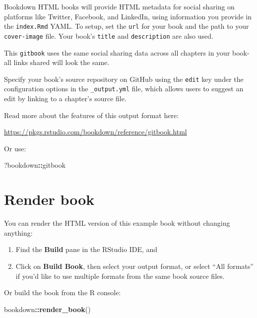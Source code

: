 \documentclass[
]{book}
\newenvironment{Shaded}{\begin{snugshade}}{\end{snugshade}}
\newcommand{\FunctionTok}[1]{\textcolor[rgb]{0.13,0.29,0.53}{\textbf{#1}}}
\newcommand{\NormalTok}[1]{#1}
\newcommand{\SpecialCharTok}[1]{\textcolor[rgb]{0.81,0.36,0.00}{\textbf{#1}}}
\theoremstyle{definition}
\theoremstyle{definition}
\theoremstyle{definition}
\theoremstyle{definition}
\theoremstyle{remark}
\begin{document}
Bookdown HTML books will provide HTML metadata for social sharing on platforms like Twitter, Facebook, and LinkedIn, using information you provide in the \texttt{index.Rmd} YAML. To setup, set the \texttt{url} for your book and the path to your \texttt{cover-image} file. Your book's \texttt{title} and \texttt{description} are also used.

This \texttt{gitbook} uses the same social sharing data across all chapters in your book- all links shared will look the same.

Specify your book's source repository on GitHub using the \texttt{edit} key under the configuration options in the \texttt{\_output.yml} file, which allows users to suggest an edit by linking to a chapter's source file.

Read more about the features of this output format here:

\url{https://pkgs.rstudio.com/bookdown/reference/gitbook.html}

Or use:

\begin{Shaded}
\begin{Highlighting}[]
\NormalTok{?bookdown}\SpecialCharTok{::}\NormalTok{gitbook}
\end{Highlighting}
\end{Shaded}

\hypertarget{render-book}{%
\section{Render book}\label{render-book}}

You can render the HTML version of this example book without changing anything:

\begin{enumerate}
\def\labelenumi{\arabic{enumi}.}
\item
  Find the \textbf{Build} pane in the RStudio IDE, and
\item
  Click on \textbf{Build Book}, then select your output format, or select ``All formats'' if you'd like to use multiple formats from the same book source files.
\end{enumerate}

Or build the book from the R console:

\begin{Shaded}
\begin{Highlighting}[]
\NormalTok{bookdown}\SpecialCharTok{::}\FunctionTok{render\_book}\NormalTok{()}
\end{Highlighting}
\end{Shaded}
\end{document}
